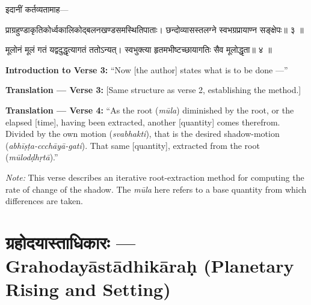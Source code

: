 \documentclass[11pt,a4paper]{article}
\newcommand{\dev}[1]{{\devanagarifont #1}}
\newenvironment{sanskritverse}{%
  \begin{center}\begin{minipage}{0.95\textwidth}
  \setlength{\leftskip}{1em}
  \setlength{\rightskip}{1em}
  \dev
}{\end{minipage}\end{center}}
\newenvironment{paracol}[1]{\begingroup}{\endgroup}
\newcommand{\switchcolumn}[1][]{%
  \ifnum#1=0\relax\else\par\nobreak\vspace{0.5em}\par\nobreak\fi%
}
\begin{document}
\begin{paracol}{2}

\begin{sanskritverse}
इदानीं कर्तव्यतामाह—
\end{sanskritverse}

\begin{sanskritverse}
प्राग्रहुण्डाकृतिकोर्ध्वकालिकोद्बलनखण्डसमस्थितिपाताः।
छन्दोव्यासस्तलग्ने स्वभग्रप्रायाण्न सङ्क्षेपः॥ ३ ॥
\end{sanskritverse}

\begin{sanskritverse}
मूलोनं मूलं गतं यद्वदुद्धृत्यागतं ततोऽन्यत्।
स्वभुक्त्या हृतमभीष्टच्छायागतिः सैव मूलोद्धृता॥ ४ ॥
\end{sanskritverse}

\switchcolumn

\textbf{Introduction to Verse 3:} ``Now [the author] states what is to be done ---''

\textbf{Translation — Verse 3:} [Same structure as verse 2, establishing the method.]

\textbf{Translation — Verse 4:} ``As the root (\textit{mūla}) diminished by the root, or the elapsed [time], having been extracted, another [quantity] comes therefrom. Divided by the own motion (\textit{svabhakti}), that is the desired shadow-motion (\textit{abhīṣṭa-ccchāyā-gati}). That same [quantity], extracted from the root (\textit{mūlodḍhṛtā}).''

\textit{Note:} This verse describes an iterative root-extraction method for computing the rate of change of the shadow. The \textit{mūla} here refers to a base quantity from which differences are taken.

\end{paracol}

\newpage

\section{\texorpdfstring{{\devanagarifont ग्रहोदयास्ताधिकारः} — Grahodayāstādhikāraḥ (Planetary Rising and Setting)}{Grahodayāstādhikāraḥ (Planetary Rising and Setting)}}
\label{sec:grahodayasta}
\end{document}
